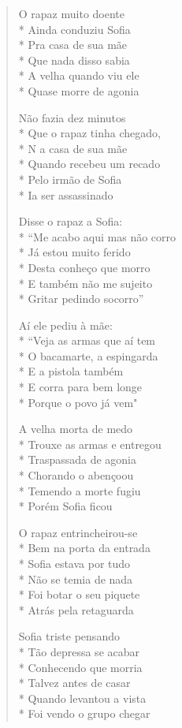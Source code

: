 \begin{verse}
O rapaz muito doente\\*
Ainda conduziu Sofia\\*
Pra casa de sua mãe\\*
Que nada disso sabia\\*
A velha quando viu ele\\*
Quase morre de agonia

Não fazia dez minutos\\*
Que o rapaz tinha chegado,\\*
N a casa de sua mãe\\*
Quando recebeu um recado\\*
Pelo irmão de Sofia\\*
Ia ser assassinado

Disse o rapaz a Sofia:\\*
``Me acabo aqui mas não corro\\*
Já estou muito ferido\\*
Desta conheço que morro\\*
E também não me sujeito\\*
Gritar pedindo socorro''

Aí ele pediu à mãe:\\*
``Veja as armas que aí tem\\*
O bacamarte, a espingarda\\*
E a pistola também\\*
E corra para bem longe\\*
Porque o povo já vem"

A velha morta de medo\\*
Trouxe as armas e entregou\\*
Traspassada de agonia\\*
Chorando o abençoou\\*
Temendo a morte fugiu\\*
Porém Sofia ficou

O rapaz entrincheirou-se\\*
Bem na porta da entrada\\*
Sofia estava por tudo\\*
Não se temia de nada\\*
Foi botar o seu piquete\\*
Atrás pela retaguarda

Sofia triste pensando\\*
Tão depressa se acabar\\*
Conhecendo que morria\\*
Talvez antes de casar\\*
Quando levantou a vista\\*
Foi vendo o grupo chegar


\end{verse}
